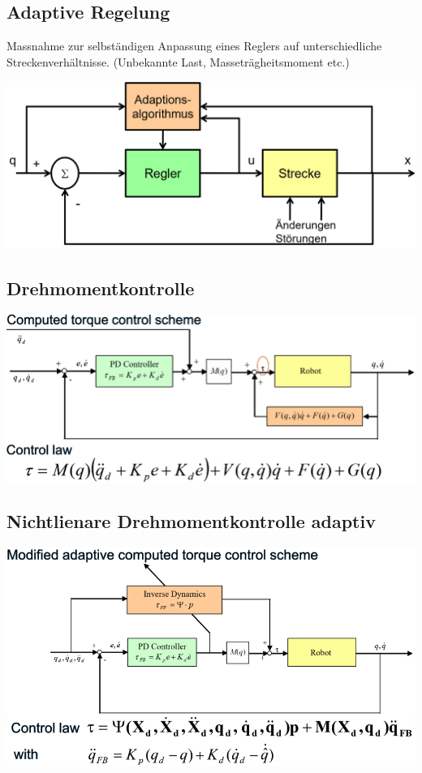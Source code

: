 \begin{minipage}{0.5\linewidth}
    \subsection{Adaptive Regelung }
    Massnahme zur selbständigen Anpassung eines Reglers auf unterschiedliche Streckenverhältnisse. (Unbekannte Last, Masseträgheitsmoment etc.)
\end{minipage}
\begin{minipage}{0.5\linewidth}
    \includegraphics[width=\linewidth]{./bilder/RegAdap}
\end{minipage}

\begin{minipage}{0.5\linewidth}
    \subsection{Drehmomentkontrolle}
    \includegraphics[width=\linewidth]{./bilder/RegMod2}
\end{minipage}
\begin{minipage}{0.5\linewidth}
    \subsection{Nichtlienare Drehmomentkontrolle adaptiv}
    \includegraphics[width=\linewidth]{./bilder/RegModNL}
\end{minipage}


